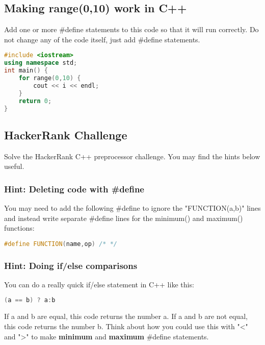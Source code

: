 \documentclass[a4paper,12pt]{article} %
\begin{document}
\subsection{Making range(0,10) work in C++}

Add one or more \#define statements to this code so that it will run correctly. Do not change any of the code itself, just add \#define statements.

\vspace{5mm}
\begin{lstlisting}[language=C++]
#include <iostream>
using namespace std;
int main() {
	for range(0,10) {
		cout << i << endl;
	}
	return 0;
}	
\end{lstlisting}

\subsection{HackerRank Challenge}

Solve the HackerRank C++ preprocessor challenge. You may find the hints below useful. 

\subsubsection{Hint: Deleting code with \#define}

You may need to add the following \#define to ignore the "FUNCTION(a,b)" lines and instead write separate \#define lines for the minimum() and maximum() functions:

\vspace{5mm}
\begin{lstlisting}[language=C++]
#define FUNCTION(name,op) /* */
\end{lstlisting}

\subsubsection{Hint: Doing if/else comparisons}

You can do a really quick if/else statement in C++ like this:

\vspace{5mm}
\begin{lstlisting}[language=C++]
(a == b) ? a:b
\end{lstlisting}

\noindent
If a and b are equal, this code returns the number a. If a and b are not equal, this code returns the number b. Think about how you could use this with "\textless" and "\textgreater" to make \textbf{minimum} and \textbf{maximum} \#define statements.
\end{document}
